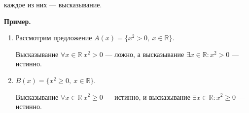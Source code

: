 \documentclass{article}
\begin{document}
    каждое из них --- высказывание.

    \textbf{Пример.}
    
    \begin{enumerate}
        \item Рассмотрим предложение \(A(x) = \{x^2 > 0,\ x \in \mathbb R\}\).
        
        Высказывание \(\forall x \in \mathbb{R}\ x^2 > 0\) --- ложно, а высказывание \(\exists x \in \mathbb{R}: x^2 > 0\) --- истинно.
        \item \(B(x) = \{x^2 \geq 0,\ x \in \mathbb R\}\).
        
        Высказывание \(\forall x \in \mathbb{R}\ x^2 \geq 0\) --- истинно, и высказывание \(\exists x \in \mathbb{R}: x^2 \geq 0\) --- истинно.
    \end{enumerate}
\end{document}
